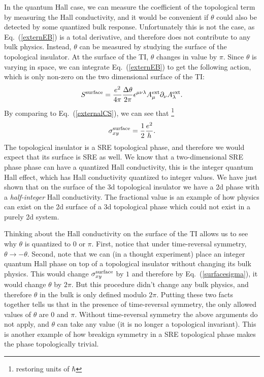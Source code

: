 In the quantum Hall case, we can measure the coefficient of the topological term by measuring the Hall conductivity, and it would be convenient if $\theta$ could also be detected by some quantized bulk response. Unfortunately this is not the case, as Eq.~(\ref{externEB}) is a total derivative, and therefore does not contribute to any bulk physics. Instead, $\theta$ can be measured by studying the surface of the topological insulator. At the surface of the TI, $\theta$ changes in value by $\pi$. Since $\theta$ is varying in space, we can integrate Eq.~(\ref{externEB}) to get the following action, which is only non-zero on the two dimensional surface of the TI:
\begin{equation}
S^{\rm surface}=\frac{e^2}{4\pi}\frac{\Delta\theta}{2\pi} \epsilon^{\mu\nu\lambda} A^{\rm ext}_\mu \partial_\nu A^{\rm ext}_\lambda.
\label{TIsurface}
\end{equation}
By comparing to Eq.~(\ref{externalCS}), we can see that 
\footnote{restoring units of $\hbar$}
\begin{equation}
\sigma_{xy}^{\rm surface}=\frac12\frac{e^2}{h}.
\label{surfacesigma}
\end{equation}
The topological insulator is a SRE topological phase, and therefore we would expect that its surface is SRE as well. We know that a two-dimensional SRE phase phase can have a quantized Hall conductivity, this is the integer quantum Hall effect, which has Hall conductivity quantized to integer values. We have just shown that on the surface of the 3d topological insulator we have a 2d phase with a {\em half-integer} Hall conductivity. 
The fractional value is an example of how physics can exist on the 2d surface of a 3d topological phase which could not exist in a purely 2d system.

Thinking about the Hall conductivity on the surface of the TI allows us to see why $\theta$ is quantized to $0$ or $\pi$. First, notice that under time-reversal symmetry, $\theta\rightarrow-\theta$. Second, note that we can (in a thought experiment) place an integer quantum Hall phase on top of a topological insulator without changing its bulk physics. This would change $\sigma_{xy}^{\rm surface}$ by $1$ and therefore by Eq.~(\ref{surfacesigma}), it would change $\theta$ by $2\pi$. But this procedure didn't change any bulk physics, and therefore $\theta$ in the bulk is only defined modulo $2\pi$. Putting these two facts together tells us that in the presence of time-reversal symmetry, the only allowed values of $\theta$ are $0$ and $\pi$. Without time-reversal symmetry the above arguments do not apply, and $\theta$ can take any value (it is no longer a topological invariant). This is another example of how breakign symmetry in a SRE topological phase makes the phase topologically trivial.

